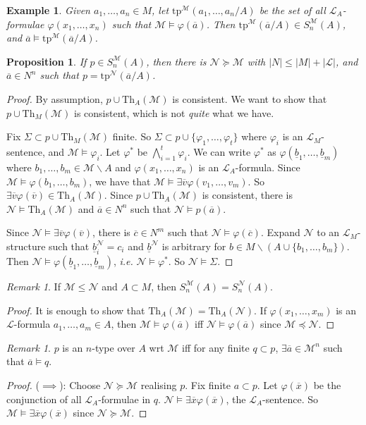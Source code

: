 \documentclass[]{article}
\theoremstyle{custhm}
\theoremstyle{cusdef}
\theoremstyle{custhm}
\theoremstyle{custhm}
\theoremstyle{custhm}
\newtheorem{prop}[theorem]{Proposition}
\theoremstyle{ex}
\newtheorem{ex}[theorem]{Example}
\theoremstyle{custhm}
\theoremstyle{cusdef}
\theoremstyle{remark}
\theoremstyle{remark}
\newtheorem{remark}[theorem]{Remark}
\renewcommand{\L}{\mathcal{L}}
\renewcommand{\it}[1]{\textit{#1}}
\newcommand{\M}{\mathcal{M}}
\renewcommand{\phi}{\varphi}
\renewcommand{\bar}{\overline}
\newcommand{\Th}{\textrm{Th}}
\newcommand{\tp}{\textrm{tp}}
\newcommand{\N}{\mathcal{N}}
\begin{document}
\begin{ex}
Given $a_1,\dots,a_n\in M$, let $\textrm{tp}^\M(a_1,\dots,a_n/A)$ be the set of all $\L_A$-formulae $\phi(x_1,\dots,x_n)$ such that $\M\models \phi(\bar{a})$. Then $\tp^\M(\bar{a}/A)\in S_n^\M(A)$, and $\bar{a}\models \tp^\M(\bar{a}/A)$.
\end{ex}
\begin{prop}
If $p \in S_n^\M(A)$, then there is $\N\succeq\M$ with $|N| \le |M| + |\L|$, and $\bar{a}\in N^n$ such that $p = \tp^\N(\bar{a}/A)$.
\end{prop}
\begin{proof}
By assumption, $p\cup\Th_A(\M)$ is consistent. We want to show that $p \cup \Th_M(\M)$ is consistent, which is not \it{quite} what we have.

Fix $\Sigma \subset p \cup \Th_M(\M)$ finite. So $\Sigma \subset p \cup \{\phi_1,\dots,\phi_t\}$ where $\phi_i$ is an $\L_M$-sentence, and $\M\models \phi_i$. Let $\phi^\ast$ be $\bigwedge_{i=1}^{t}\phi_i$. We can write $\phi^\ast$ as $\phi(\underline{b}_1,\dots,\underline{b}_m)$ where $b_1,\dots,b_m\in \M\backslash A$ and $\phi(x_1,\dots,x_n)$ is an $\L_A$-formula. Since $\M\models \phi(b_1,\dots,b_m)$, we have that $\M\models \exists \bar{v}\phi(v_1,\dots,v_m)$. So $\exists \bar{v}\phi(\bar{v})\in \Th_A(\M)$. Since $p\cup \Th_A(\M)$ is consistent, there is $\N\models \Th_A(\M)$ and $\bar{a} \in N^n$ such that $\N\models p(\bar{a})$.

Since $\N\models \exists \bar{v}\phi(\bar{v})$, there is $\bar{c} \in N^m$ such that $\N\models \phi(\bar{c})$. Expand $\N$ to an $\L_M$-structure such that $\underline{b}_i^\N = c_i$ and $\underline{b}^\N$ is arbitrary for $b\in M\backslash (A\cup \{b_1,\dots,b_m\})$. Then $\N\models \phi(\underline{b}_1,\dots,\underline{b}_m)$, \it{i.e.} $\N\models \phi^\ast$. So $\N\models \Sigma$.
\end{proof}


\begin{remark}
If $\M\le \N$ and $A \subset M$, then $S_n^\M(A) = S_n^\N(A)$.
\end{remark}
\begin{proof}
It is enough to show that $\Th_A(\M) = \Th_A(\N)$. If $\phi(x_1,\dots,x_m)$ is an $\L$-formula $a_1,\dots,a_m\in A$, then $\M\models \phi(\bar{a})$ iff $\N\models \phi(\bar{a})$ since $\M\preceq \N$.
\end{proof}
\begin{remark}
	$p$ is an $n$-type over $A$ wrt $\M$ iff for any finite $q \subset p$, $\exists \bar{a}\in \M^n$ such that $\bar{a}\models q$.
\end{remark}
\begin{proof}
($\implies$): Choose $\N\succeq \M$ realising $p$. Fix finite $a \subset p$. Let $\phi(\bar{x})$ be the conjunction of all $\L_A$-formulae in $q$. $\N\models \exists \bar{x}\phi(\bar{x})$, the $\L_A$-sentence. So $\M\models \exists \bar{x}\phi(\bar{x})$ since $\N\succeq \M$.
\end{proof}
\end{document}
